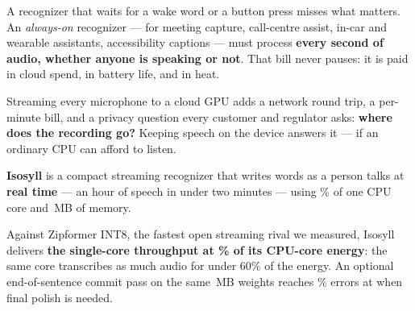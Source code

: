 \documentclass[letterpaper]{article}
\begin{document}
\noindent
\begin{minipage}[t]{0.486\textwidth}
  \vspace{0pt}
  {\fontsize{8.25}{10.2}\selectfont
  A recognizer that waits for a wake word or a button press misses what matters. An \emph{always-on} recognizer --- for meeting capture, call-centre assist, in-car and wearable assistants, accessibility captions --- must process \textbf{every second of audio, whether anyone is speaking or not}. That bill never pauses: it is paid in cloud spend, in battery life, and in heat.

  \vspace{2pt}
  Streaming every microphone to a cloud GPU adds a network round trip, a per-minute bill, and a privacy question every customer and regulator asks: \textbf{where does the recording go?} Keeping speech on the device answers it --- if an ordinary CPU can afford to listen.
  }
\end{minipage}\hfill
\begin{minipage}[t]{0.486\textwidth}
  \vspace{0pt}
  {\fontsize{8.25}{10.2}\selectfont
  \textbf{Isosyll} is a compact streaming recognizer that writes words as a person talks at \textbf{\ColdRcTwoLiveLmSpeed\x{} real time} --- an hour of speech in under two minutes --- using \ColdRcTwoLiveLmCorePct\% of one CPU core and \ColdRcTwoLiveLmRss\,MB of memory.

  \vspace{2pt}
  Against Zipformer INT8, the fastest open streaming rival we measured, Isosyll delivers \textbf{\VsSpeedXOne\x{} the single-core throughput at \VsEnergyPctOne\% of its CPU-core energy}: the same core transcribes \VsSpeedXOne\x{} as much audio for under 60\% of the energy. An optional end-of-sentence commit pass on the same \ColdRcTwoLiveLmModel\,MB weights reaches \ColdRcTwoFinalWer\% errors at \ColdRcTwoFinalSpeed\x{} when final polish is needed.
  }
\end{minipage}

\vspace{5pt}

\begin{tcolorbox}[enhanced,colback=white,colframe=hair,boxrule=0.5pt,arc=2.5pt,
  left=6pt,right=6pt,top=5.5pt,bottom=4.5pt,before skip=0pt,after skip=0pt]
  \centering
  \par
  \vspace{2.5pt}
  \raggedright
\end{tcolorbox}
\end{document}
